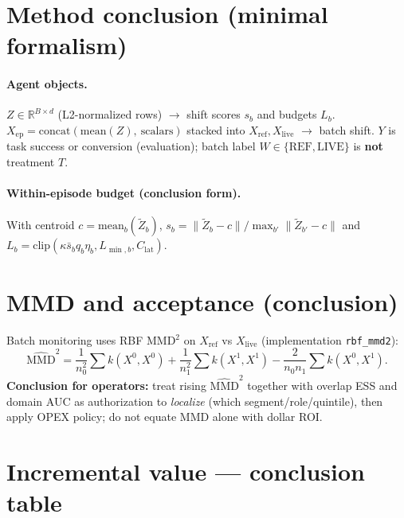 \documentclass[11pt]{article}
\begin{document}
\section{Method conclusion (minimal formalism)}

\paragraph{Agent objects.}
$Z\in\mathbb{R}^{B\times d}$ (L2-normalized rows) $\rightarrow$ shift scores $s_b$ and budgets $L_b$.
$X_{\mathrm{ep}}=\mathrm{concat}(\mathrm{mean}(Z),\ \text{scalars})$ stacked into $X_{\mathrm{ref}}, X_{\mathrm{live}}$ $\rightarrow$ batch shift.
$Y$ is task success or conversion (evaluation); batch label $W\in\{\mathrm{REF},\mathrm{LIVE}\}$ is \textbf{not} treatment $T$.

\paragraph{Within-episode budget (conclusion form).}
With centroid $c=\mathrm{mean}_b(\tilde{Z}_b)$,
$s_b=\|\tilde{Z}_b-c\|/\max_{b'}\|\tilde{Z}_{b'}-c\|$ and
$L_b=\mathrm{clip}(\kappa\bar{s}_b q_b \eta_b, L_{\min,b}, C_{\mathrm{lat}})$.

\section{MMD and acceptance (conclusion)}
\label{sec:mmd-conclude}
Batch monitoring uses RBF MMD$^2$ on $X_{\mathrm{ref}}$ vs $X_{\mathrm{live}}$ (implementation \texttt{rbf\_mmd2}):
\[
\widehat{\mathrm{MMD}}^2
= \frac{1}{n_0^2}\sum k(X^0,X^0)
+ \frac{1}{n_1^2}\sum k(X^1,X^1)
- \frac{2}{n_0 n_1}\sum k(X^0,X^1).
\]
\textbf{Conclusion for operators:} treat rising $\widehat{\mathrm{MMD}}^2$ together with overlap ESS and domain AUC as authorization to \emph{localize} (which segment/role/quintile), then apply OPEX policy; do not equate MMD alone with dollar ROI.

\section{Incremental value --- conclusion table}
\end{document}

